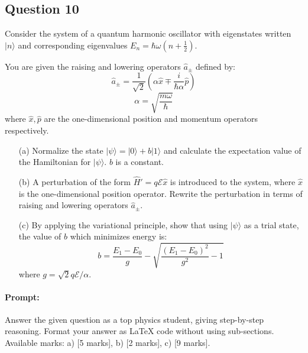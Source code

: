 \documentclass{article}
\begin{document}


\subsection{Question 10}

Consider the system of a quantum harmonic oscillator with eigenstates written \(|n\rangle\) and corresponding eigenvalues \(E_n = \hbar\omega(n + \frac{1}{2})\). 

You are given the raising and lowering operators \(\hat{a}_\pm\) defined by:
\[
\hat{a}_\pm = \frac{1}{\sqrt{2}} \left(\alpha \hat{x} \mp \frac{i}{\hbar \alpha} \hat{p}\right)
\]
\[
\alpha = \sqrt{\frac{m\omega}{\hbar}}
\]
where \(\hat{x}, \hat{p}\) are the one-dimensional position and momentum operators respectively.

\begin{enumerate}
    \item[(a)] Normalize the state \(|\psi\rangle = |0\rangle + b |1\rangle\) and calculate the expectation value of the Hamiltonian for \(|\psi\rangle\). \(b\) is a constant.
    
    \item[(b)] A perturbation of the form \(\hat{H}' = q \mathcal{E} \hat{x}\) is introduced to the system, where \(\hat{x}\) is the one-dimensional position operator. Rewrite the perturbation in terms of raising and lowering operators \(\hat{a}_\pm\).
    
    \item[(c)] By applying the variational principle, show that using \(|\psi\rangle\) as a trial state, the value of \(b\) which minimizes energy is:
    \[
    b = \frac{E_1 - E_0}{g} - \sqrt{\frac{(E_1 - E_0)^2}{g^2} - 1}
    \]
    where \(g = \sqrt{2}q\mathcal{E}/\alpha\).
\end{enumerate}

\paragraph{Prompt: \\} 
Answer the given question as a top physics student, giving step-by-step reasoning. Format your answer as LaTeX code without using sub-sections. Available marks: a) [5 marks], b) [2 marks], c) [9 marks].
\end{document}

